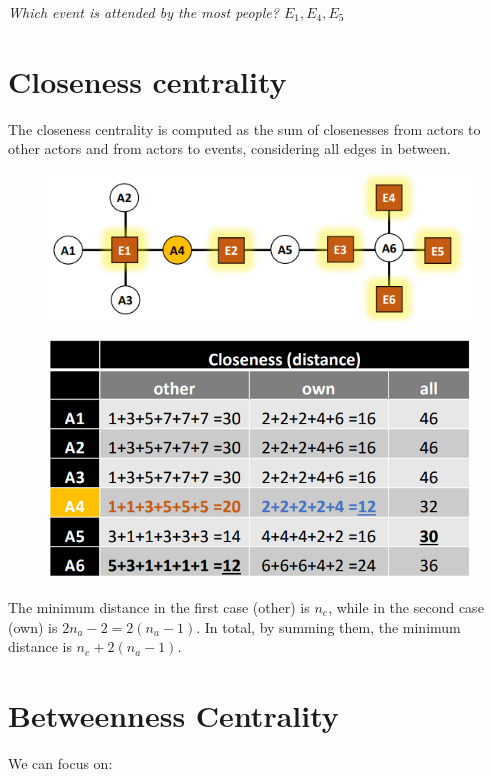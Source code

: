 \documentclass[
  notitlepage,
  onecolumn,
  openany]{book}
\begin{document}
\emph{Which event is attended by the most people? \(E_1, E_4, E_5\)}

\hypertarget{closeness-centrality-1}{%
\section{Closeness centrality}\label{closeness-centrality-1}}

The closeness centrality is computed as the sum of closenesses from actors to other actors and from actors to events, considering all edges in between.

\begin{figure}[h!]

{\centering \includegraphics[width=0.5\linewidth]{images/10-Two mode networks/Untitled 8} 

}

\end{figure}

\begin{figure}[h!]

{\centering \includegraphics[width=0.5\linewidth]{images/10-Two mode networks/Untitled 9} 

}

\end{figure}

The minimum distance in the first case (other) is \(n_e\), while in the second case (own) is \(2n_a-2 = 2(n_a-1)\). In total, by summing them, the minimum distance is \(n_e+2(n_a-1)\).

\hypertarget{betweenness-centrality-1}{%
\section{Betweenness Centrality}\label{betweenness-centrality-1}}

We can focus on:
\end{document}
